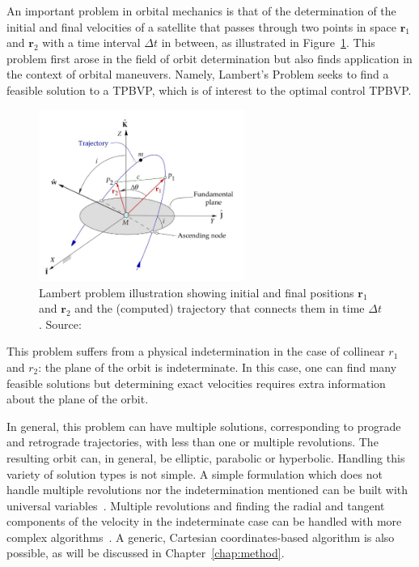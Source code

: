 An important problem in orbital mechanics is that of the determination of the initial and final velocities of a satellite that passes through two points in space \(\mathbf{r}_1\) and \(\mathbf{r}_2\) with a time interval \(\Delta t\) in between, as illustrated in Figure~\ref{fig:lambert_diagram}. This problem first arose in the field of orbit determination but also finds application in the context of orbital maneuvers. Namely, Lambert's Problem seeks to find a feasible solution to a TPBVP, which is of interest to the optimal control TPBVP. 

\begin{figure}[htbp]
    \centering
    \includegraphics[width=0.6\textwidth]{img/lambert_from_curtis.png}
    \caption{Lambert problem illustration showing initial and final positions \(\mathbf{r}_1\) and \(\mathbf{r}_2\) and the (computed) trajectory that connects them in time \(\Delta t\). Source: \cite{curtis2015orbital}}
    \label{fig:lambert_diagram}
\end{figure}

This problem suffers from a physical indetermination in the case of collinear \(r_1\) and \(r_2\): the plane of the orbit is indeterminate. In this case, one can find many feasible solutions but determining exact velocities requires extra information about the plane of the orbit.\

In general, this problem can have multiple solutions, corresponding to prograde and retrograde trajectories, with less than one or multiple revolutions. The resulting orbit can, in general, be elliptic, parabolic or hyperbolic. Handling this variety of solution types is not simple. A simple formulation which does not handle multiple revolutions nor the indetermination mentioned can be built with universal variables~\cite{curtis2015orbital}. Multiple revolutions and finding the radial and tangent components of the velocity in the indeterminate case can be handled with more complex algorithms~\cite{sukhanov}. A generic, Cartesian coordinates-based algorithm is also possible, as will be discussed in Chapter~\ref{chap:method}.


